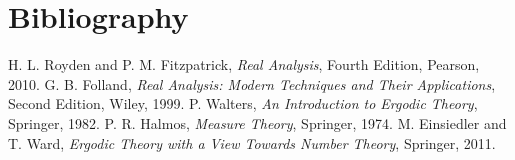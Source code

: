 \documentclass[12pt]{article}
\begin{document}
\section{Bibliography}
\begin{thebibliography}{99}
     H. L. Royden and P. M. Fitzpatrick, \emph{Real Analysis}, Fourth Edition, Pearson, 2010.
     G. B. Folland, \emph{Real Analysis: Modern Techniques and Their Applications}, Second Edition, Wiley, 1999.
     P. Walters, \emph{An Introduction to Ergodic Theory}, Springer, 1982.
     P. R. Halmos, \emph{Measure Theory}, Springer, 1974.
     M. Einsiedler and T. Ward, \emph{Ergodic Theory with a View Towards Number Theory}, Springer, 2011.
\end{thebibliography}
\end{document}

